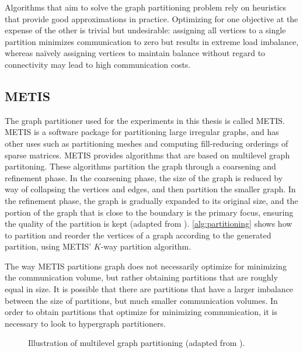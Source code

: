 Algorithms that aim to solve the graph partitioning problem rely on heuristics that provide good approximations in practice. Optimizing for one objective at the expense of the other is trivial but undesirable: assigning all vertices to a single partition minimizes communication to zero but results in extreme load imbalance, whereas naïvely assigning vertices to maintain balance without regard to connectivity may lead to high communication costs.

\subsection{METIS}
The graph partitioner used for the experiments in this thesis is called METIS. METIS is a software package for partitioning large irregular graphs, and has other uses such as partitioning meshes and computing fill-reducing orderings of sparse matrices. METIS provides algorithms that are based on multilevel graph partitoning. These algorithms partition the graph through a coarsening and refinement phase. In the coarsening phase, the size of the graph is reduced by way of collapsing the vertices and edges, and then partition the smaller graph. In the refinement phase, the graph is gradually expanded to its original size, and the portion of the graph that is close to the boundary is the primary focus, ensuring the quality of the partition is kept (adapted from \cite{karypis1997metis}). \autoref{alg:partitioning} shows how to partition and reorder the vertices of a graph according to the generated partition, using METIS' \(K\)-way partition algorithm.
\medskip

The way METIS partitions graph does not necessarily optimize for minimizing the communication volume, but rather obtaining partitions that are roughly equal in size. It is possible that there are partitions that have a larger imbalance between the size of partitions, but much smaller communication volumes. In order to obtain partitions that optimize for minimizing communication, it is necessary to look to hypergraph partitioners.

\begin{figure}[H]
    \centering
    \caption{Illustration of multilevel graph partitioning (adapted from \cite{karypis1997metis}).}
    \label{fig:coarseninggraph}
\end{figure}

